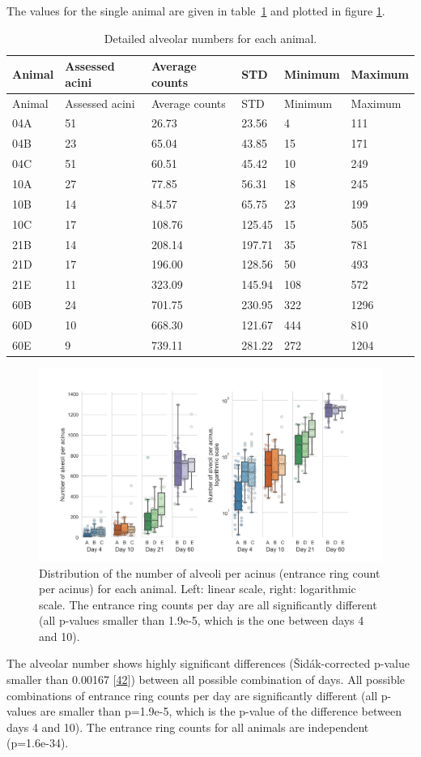 \documentclass[
  american,
]{article}
\begin{document}
The values for the single animal are given in table~\ref{tbl:counts} and plotted in figure \ref{fig:02}.

\begin{longtable}[]{@{}llllll@{}}
\caption{Detailed alveolar numbers for each animal. \label{tbl:counts}}\tabularnewline
\toprule
Animal & Assessed acini & Average counts & STD & Minimum & Maximum\tabularnewline
\midrule
\endfirsthead
\toprule
Animal & Assessed acini & Average counts & STD & Minimum & Maximum\tabularnewline
\midrule
\endhead
04A & 51 & 26.73 & 23.56 & 4 & 111\tabularnewline
04B & 23 & 65.04 & 43.85 & 15 & 171\tabularnewline
04C & 51 & 60.51 & 45.42 & 10 & 249\tabularnewline
10A & 27 & 77.85 & 56.31 & 18 & 245\tabularnewline
10B & 14 & 84.57 & 65.75 & 23 & 199\tabularnewline
10C & 17 & 108.76 & 125.45 & 15 & 505\tabularnewline
21B & 14 & 208.14 & 197.71 & 35 & 781\tabularnewline
21D & 17 & 196.00 & 128.56 & 50 & 493\tabularnewline
21E & 11 & 323.09 & 145.94 & 108 & 572\tabularnewline
60B & 24 & 701.75 & 230.95 & 322 & 1296\tabularnewline
60D & 10 & 668.30 & 121.67 & 444 & 810\tabularnewline
60E & 9 & 739.11 & 281.22 & 272 & 1204\tabularnewline
\bottomrule
\end{longtable}

\begin{figure}
\hypertarget{fig:02}{%
\centering
\includegraphics{images/fig02.png}
\caption{Distribution of the number of alveoli per acinus (entrance ring count per acinus) for each animal.
Left: linear scale, right: logarithmic scale.
The entrance ring counts per day are all significantly different (all p-values smaller than 1.9e-5, which is the one between days 4 and 10).}\label{fig:02}
}
\end{figure}

The alveolar number shows highly significant differences (Šidák-corrected p-value smaller than 0.00167 {[}\protect\hyperlink{ref-GtCynqsI}{42}{]}) between all possible combination of days.
All possible combinations of entrance ring counts per day are significantly different (all p-values are smaller than p=1.9e-5, which is the p-value of the difference between days 4 and 10).
The entrance ring counts for all animals are independent (p=1.6e-34).
\end{document}
